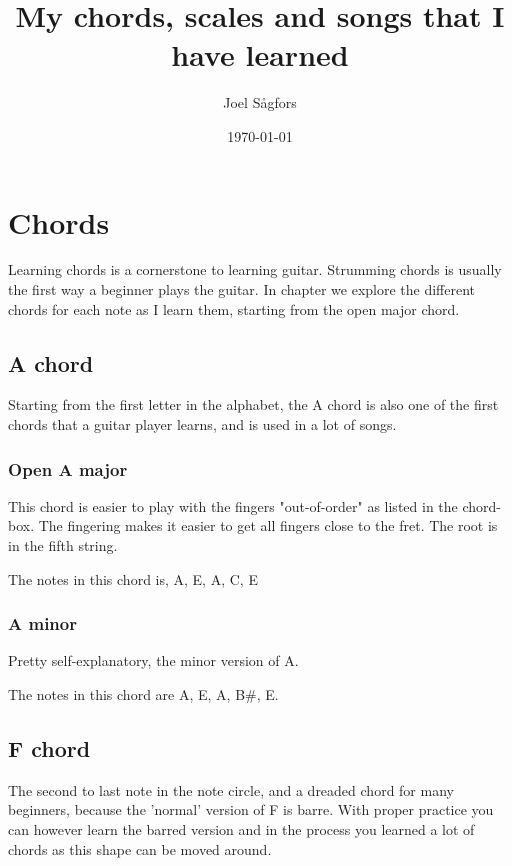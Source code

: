 \documentclass[11pt]{book}
\title{My chords, scales and songs that I have learned}
\author{Joel Sågfors}
\date{\today}
\begin{document}
    \maketitle


    \chapter{Chords}
    Learning chords is a cornerstone to learning guitar. Strumming chords is usually the first way a beginner plays the guitar.
    In chapter we explore the different chords for each note as I learn them, starting from the open major chord.


    \section{A chord}
    Starting from the first letter in the alphabet, the A chord is also one of the first chords that a guitar player learns,
    and is used in a lot of songs.

    \subsection{Open A major}
    This chord is easier to play with the fingers "out-of-order" as listed in the chord-box.
    The fingering makes it easier to get all fingers close to the fret.
    The root is in the fifth string.

    \chordscheme[
    name   = A,
    finger = {2/4:2,2/3:1,2/2:3},
    ring   = {5,1},
    mute   = {6}
    ]

    The notes in this chord is, A, E, A, C, E

    \subsection{A minor}
    Pretty self-explanatory, the minor version of A.

    \chordscheme[
    name = Am,
    finger = {2/4:2, 2/3:3, 2/2.1},
    ring = {5,1},
    mute = {6}
    ]

    The notes in this chord are A, E, A, B\#, E.


    \section{F chord}
    The second to last note in the note circle, and a dreaded chord for many beginners, because the 'normal' version of
    F is barre.
    With proper practice you can however learn the barred version and in the process you learned a lot of chords as this shape can be moved around.
\end{document}
